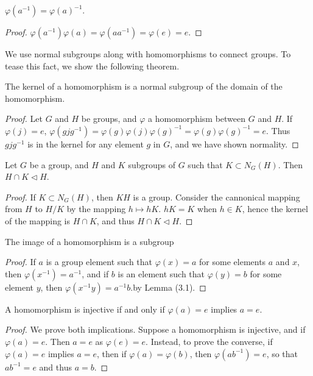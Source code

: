 \begin{lemma} $\varphi(a^{-1}) = \varphi(a)^{-1}$. \end{lemma}
\begin{proof} $\varphi(a^{-1})\varphi(a) = \varphi(aa^{-1}) = \varphi(e) = e$. \end{proof}

We use normal subgroups along with homomorphisms to connect groups. To tease this fact, we show the following theorem.

\begin{lemma} The kernel of a homomorphism is a normal subgroup of the domain of the homomorphism. \end{lemma}
\begin{proof} Let $G$ and $H$ be groups, and $\varphi$ a homomorphism between $G$ and $H$. If $\varphi(j)=e$, $\varphi(gjg^{-1}) = \varphi(g)\varphi(j)\varphi(g)^{-1} = \varphi(g)\varphi(g)^{-1} = e$. Thus $gjg^{-1}$ is in the kernel for any element $g$ in $G$, and we have shown normality. \end{proof}

\begin{corollary}
    Let $G$ be a group, and $H$ and $K$ subgroups of $G$ such that $K \subset N_G(H)$. Then $H \cap K \lhd H$.
\end{corollary}
\begin{proof}
    If $K \subset N_G(H)$, then $KH$ is a group. Consider the cannonical mapping from $H$ to $H/K$ by the mapping $h \mapsto hK$. $hK = K$ when $h \in K$, hence the kernel of the mapping is $H \cap K$, and thus $H \cap K \lhd H$.
\end{proof}

\begin{lemma} The image of a homomorphism is a subgroup \end{lemma}
\begin{proof} If $a$ is a group element such that $\varphi(x) = a$ for some elements $a$ and $x$, then $\varphi(x^{-1}) = a^{-1}$, and if $b$ is an element such that $\varphi(y) = b$ for some element $y$, then $\varphi(x^{-1}y) = a^{-1}b$.by Lemma (3.1). \end{proof}

\begin{lemma} A homomorphism is injective if and only if $\varphi(a) = e$ implies $a = e$. \end{lemma}
\begin{proof} We prove both implications. Suppose a homomorphism is injective, and if $\varphi(a) = e$. Then $a = e$ as $\varphi(e) = e$. Instead, to prove the converse, if $\varphi(a) = e$ implies $a = e$, then if $\varphi(a) = \varphi(b)$, then $\varphi(ab^{-1}) = e$, so that $ab^{-1} = e$ and thus $a = b$.
\end{proof}

